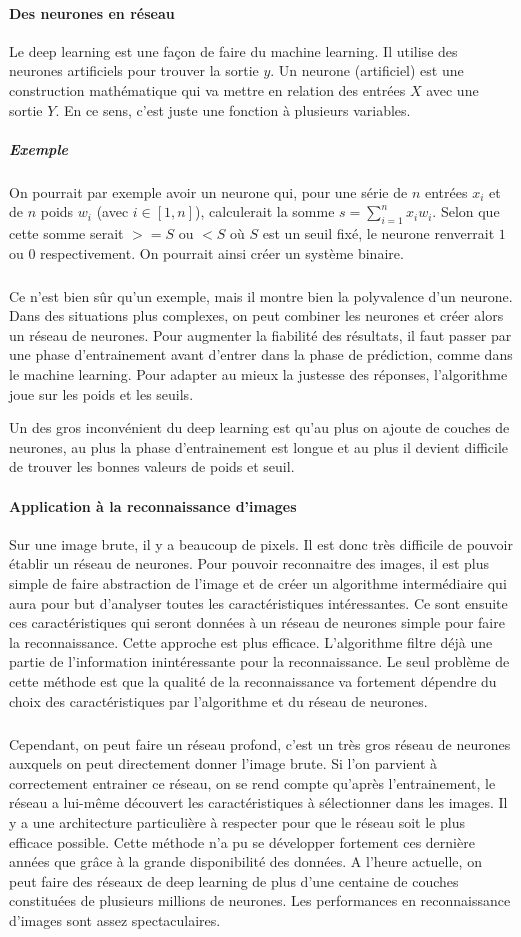 \paragraph{Des neurones en réseau}
Le deep learning est une façon de faire du machine learning. Il utilise des neurones artificiels pour trouver la sortie $y$.
Un neurone (artificiel) est une construction mathématique qui va mettre en relation des entrées $X$ avec une sortie $Y$. En ce sens, c'est juste une fonction à plusieurs variables.

\subparagraph{Exemple}
On pourrait par exemple avoir un neurone qui, pour une série de $n$ entrées $x_i$ et de $n$ poids $w_i$ (avec $i \in [1, n]$), calculerait la somme $s = \sum_{i = 1}^n x_iw_i$. Selon que cette somme serait $>= S$ ou $< S$ où $S$ est un seuil fixé, le neurone renverrait $1$ ou $0$ respectivement. On pourrait ainsi créer un système binaire.
\subparagraph{}
Ce n'est bien sûr qu'un exemple, mais il montre bien la polyvalence d'un neurone.
Dans des situations plus complexes, on peut combiner les neurones et créer alors un réseau de
neurones.
Pour augmenter la fiabilité des résultats, il faut passer par une phase d’entrainement avant d’entrer dans la phase de prédiction, comme dans le machine learning.
Pour adapter au mieux la justesse des réponses, l’algorithme joue sur les poids et les seuils.

Un des gros inconvénient du deep learning est qu’au plus on ajoute de couches de neurones, au plus
la phase d’entrainement est longue et au plus il devient difficile de trouver les bonnes valeurs de
poids et seuil.

\paragraph{Application à la reconnaissance d'images}
Sur une image brute, il y a beaucoup de pixels. Il est donc très difficile de pouvoir établir un réseau de
neurones.
Pour pouvoir reconnaitre des images, il est plus simple de faire abstraction de l’image et de créer un
algorithme intermédiaire qui aura pour but d’analyser toutes les caractéristiques intéressantes. Ce
sont ensuite ces caractéristiques qui seront données à un réseau de neurones simple pour faire la
reconnaissance. Cette approche est plus efficace. L’algorithme filtre déjà une partie de l’information
inintéressante pour la reconnaissance. Le seul problème de cette méthode est que la qualité de la reconnaissance va fortement
dépendre du choix des caractéristiques par l’algorithme et du réseau de neurones.
\subparagraph{}
Cependant, on peut faire un réseau profond, c’est un très gros réseau de neurones auxquels on peut
directement donner l’image brute. Si l’on parvient à correctement entrainer ce réseau, on se rend
compte qu’après l’entrainement, le réseau a lui-même découvert les caractéristiques à sélectionner dans les images. Il y a une architecture particulière à respecter pour que le réseau soit le plus efficace possible. Cette méthode n’a pu se développer fortement ces dernière années que grâce à la grande disponibilité des données. A l’heure actuelle, on peut faire des réseaux de deep learning de plus d’une centaine de couches constituées de plusieurs millions de neurones. Les performances en
reconnaissance d’images sont assez spectaculaires.